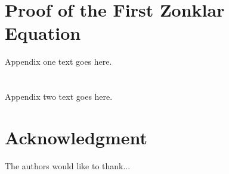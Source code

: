 \documentclass[journal]{IEEEtran}
\begin{document}
%


\appendices
\section{Proof of the First Zonklar Equation}
Appendix one text goes here.

\section{}
Appendix two text goes here.


\section*{Acknowledgment}


The authors would like to thank...


\ifCLASSOPTIONcaptionsoff
  \newpage
\fi




\end{document}
